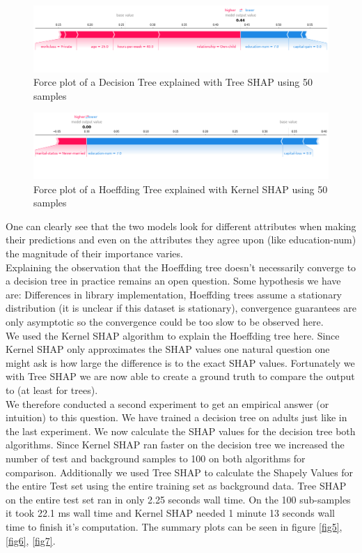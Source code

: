 \documentclass[conference]{IEEEtran}
\begin{document}
\begin{figure}[htbp]
\centerline{
	\includegraphics[width=\linewidth]{../fig/ex_01_TreeShap_DecisionTree_50_Samples_ForcePlot_sample_1.png}
}
\caption{Force plot of a Decision Tree explained with Tree SHAP using 50 samples}
\label{fig3}
\end{figure}

\begin{figure}[htbp]
\centerline{
	\includegraphics[width=\linewidth]{../fig/ex_01_KernelShap_HoeffdingTree_50_Samples_ForcePlot_sample_1.png}
}
\caption{Force plot of a Hoeffding Tree explained with Kernel SHAP using 50 samples}
\label{fig4}
\end{figure}

One can clearly see that the two models look for different attributes when making their predictions and even on the attributes they agree upon (like education-num) the magnitude of their importance varies.\\
Explaining the observation that the Hoeffding tree doesn't necessarily converge to a decision tree in practice remains an open question.
Some hypothesis we have are: Differences in library implementation, Hoeffding trees assume a stationary distribution (it is unclear if this dataset is stationary), convergence guarantees are only asymptotic so the convergence could be too slow to be observed here.\\

We used the Kernel SHAP algorithm to explain the Hoeffding tree here. Since Kernel SHAP only approximates the SHAP values one natural question one might ask is how large the difference is to the exact SHAP values.
Fortunately we with Tree SHAP we are now able to create a ground truth to compare the output to (at least for trees).\\
We therefore conducted a second experiment to get an empirical answer (or intuition) to this question.
We have trained a decision tree on adults just like in the last experiment. 
We now calculate the SHAP values for the decision tree both algorithms. 
Since Kernel SHAP ran faster on the decision tree we increased the number of test and background samples to 100 on both algorithms for comparison.
Additionally we used Tree SHAP to calculate the Shapely Values for the entire Test set using the entire training set as background data.
Tree SHAP on the entire test set ran in only 2.25 seconds wall time. On the 100 sub-samples it took 22.1 ms wall time and Kernel SHAP needed 1 minute 13 seconds wall time to finish it's computation.
The summary plots can be seen in figure \ref{fig5}, \ref{fig6}, \ref{fig7}.
\end{document}
